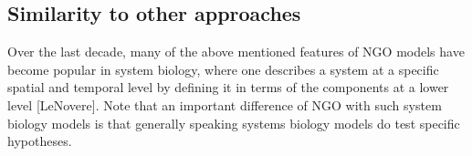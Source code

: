 \subsection{Similarity to other approaches}

Over the last decade, many of the above mentioned features of NGO models have become popular in system biology, where one describes a system at a specific spatial and temporal level by defining it in terms of the components at a lower level [LeNovere]. Note that an important difference of NGO with such system biology models is that generally speaking systems biology models do test specific hypotheses.
  